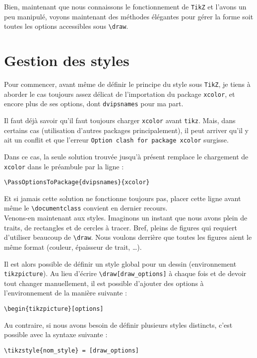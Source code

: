 
Bien, maintenant que nous connaissons le fonctionnement de \texttt{TikZ} et l'avons un peu manipulé, voyons maintenant des méthodes élégantes pour gérer la forme soit toutes les options accessibles sous \verb?\draw?.

\section{Gestion des styles}

Pour commencer, avant même de définir le principe du style sous \texttt{TikZ}, je tiens à aborder le cas toujours assez délicat de l'importation du package \verb?xcolor?, et encore plus de ses options, dont \verb?dvipsnames? pour ma part.

Il faut déjà savoir qu'il faut toujours charger \verb?xcolor? avant \verb?tikz?. Mais, dans certains cas (utilisation d'autres packages principalement), il peut arriver qu'il y ait un conflit et que l'erreur \verb?Option clash for package xcolor? surgisse.

Dans ce cas, la seule solution trouvée jusqu'à présent remplace le chargement de \verb?xcolor? dans le préambule par la ligne : \begin{center} \verb?\PassOptionsToPackage{dvipsnames}{xcolor}? \end{center}

Et si jamais cette solution ne fonctionne toujours pas, placer cette ligne avant même le \verb?\documentclass? convient en dernier recours. \\

Venons-en maintenant aux styles. Imaginons un instant que nous avons plein de traits, de rectangles et de cercles à tracer. Bref, pleins de figures qui requiert d'utiliser beaucoup de \verb?\draw?. Nous voulons derrière que toutes les figures aient le même format (couleur, épaisseur de trait, \dots{}).

Il est alors possible de définir un style global pour un dessin (environnement \verb?tikzpicture?). Au lieu d'écrire \verb?\draw[draw_options]? à chaque fois et de devoir tout changer manuellement, il est possible d'ajouter des options à l'environnement de la manière suivante : \begin{center} \verb?\begin{tikzpicture}[options]? \end{center}

Au contraire, si nous avons besoin de définir plusieurs styles distincts, c'est possible avec la syntaxe suivante : \begin{center} \verb?\tikzstyle{nom_style} = [draw_options]? \end{center}

